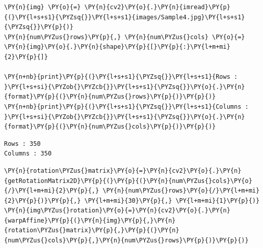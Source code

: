 \begin{tcolorbox}[breakable, size=fbox, boxrule=1pt, pad at break*=1mm,colback=cellbackground, colframe=cellborder]
	\begin{Verbatim}[commandchars=\\\{\}]
\PY{n}{img} \PY{o}{=} \PY{n}{cv2}\PY{o}{.}\PY{n}{imread}\PY{p}{(}\PY{l+s+s1}{\PYZsq{}}\PY{l+s+s1}{images/Sample4.jpg}\PY{l+s+s1}{\PYZsq{}}\PY{p}{)}
\PY{n}{num\PYZus{}rows}\PY{p}{,} \PY{n}{num\PYZus{}cols} \PY{o}{=} \PY{n}{img}\PY{o}{.}\PY{n}{shape}\PY{p}{[}\PY{p}{:}\PY{l+m+mi}{2}\PY{p}{]}
		
\PY{n+nb}{print}\PY{p}{(}\PY{l+s+s1}{\PYZsq{}}\PY{l+s+s1}{Rows : }\PY{l+s+si}{\PYZob{}\PYZcb{}}\PY{l+s+s1}{\PYZsq{}}\PY{o}{.}\PY{n}{format}\PY{p}{(}\PY{n}{num\PYZus{}rows}\PY{p}{)}\PY{p}{)}
\PY{n+nb}{print}\PY{p}{(}\PY{l+s+s1}{\PYZsq{}}\PY{l+s+s1}{Columns : }\PY{l+s+si}{\PYZob{}\PYZcb{}}\PY{l+s+s1}{\PYZsq{}}\PY{o}{.}\PY{n}{format}\PY{p}{(}\PY{n}{num\PYZus{}cols}\PY{p}{)}\PY{p}{)}
	\end{Verbatim}
\end{tcolorbox}

\begin{Verbatim}[commandchars=\\\{\}]
Rows : 350
Columns : 350
\end{Verbatim}

\begin{tcolorbox}[breakable, size=fbox, boxrule=1pt, pad at break*=1mm,colback=cellbackground, colframe=cellborder]
	\begin{Verbatim}[commandchars=\\\{\}]
\PY{n}{rotation\PYZus{}matrix}\PY{o}{=}\PY{n}{cv2}\PY{o}{.}\PY{n}{getRotationMatrix2D}\PY{p}{(}\PY{p}{(}\PY{n}{num\PYZus{}cols}\PY{o}{/}\PY{l+m+mi}{2}\PY{p}{,} \PY{n}{num\PYZus{}rows}\PY{o}{/}\PY{l+m+mi}{2}\PY{p}{)}\PY{p}{,} \PY{l+m+mi}{30}\PY{p}{,} \PY{l+m+mi}{1}\PY{p}{)}
\PY{n}{img\PYZus{}rotation}\PY{o}{=}\PY{n}{cv2}\PY{o}{.}\PY{n}{warpAffine}\PY{p}{(}\PY{n}{img}\PY{p}{,}\PY{n}{rotation\PYZus{}matrix}\PY{p}{,}\PY{p}{(}\PY{n}{num\PYZus{}cols}\PY{p}{,}\PY{n}{num\PYZus{}rows}\PY{p}{)}\PY{p}{)}                                
	\end{Verbatim}
\end{tcolorbox}

